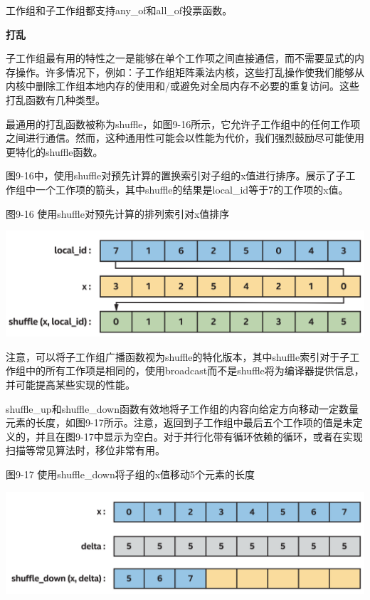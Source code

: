工作组和子工作组都支持any\_of和all\_of投票函数。\par

\hspace*{\fill} \par %
\textbf{打乱}

子工作组最有用的特性之一是能够在单个工作项之间直接通信，而不需要显式的内存操作。许多情况下，例如：子工作组矩阵乘法内核，这些打乱操作使我们能够从内核中删除工作组本地内存的使用和/或避免对全局内存不必要的重复访问。这些打乱函数有几种类型。\par

最通用的打乱函数被称为shuffle，如图9-16所示，它允许子工作组中的任何工作项之间进行通信。然而，这种通用性可能会以性能为代价，我们强烈鼓励尽可能使用更特化的shuffle函数。\par

图9-16中，使用shuffle对预先计算的置换索引对子组的x值进行排序。展示了子工作组中一个工作项的箭头，其中shuffle的结果是local\_id等于7的工作项的x值。\par

\hspace*{\fill} \par %
图9-16 使用shuffle对预先计算的排列索引对x值排序
\begin{center}
	\includegraphics[width=1.\textwidth]{content/chapter-9/images/9}
\end{center}

注意，可以将子工作组广播函数视为shuffle的特化版本，其中shuffle索引对于子工作组中的所有工作项是相同的，使用broadcast而不是shuffle将为编译器提供信息，并可能提高某些实现的性能。\par

shuffle\_up和shuffle\_down函数有效地将子工作组的内容向给定方向移动一定数量元素的长度，如图9-17所示。注意，返回到子工作组中最后五个工作项的值是未定义的，并且在图9-17中显示为空白。对于并行化带有循环依赖的循环，或者在实现扫描等常见算法时，移位非常有用。\par

\hspace*{\fill} \par %
图9-17 使用shuffle\_down将子组的x值移动5个元素的长度
\begin{center}
	\includegraphics[width=1.\textwidth]{content/chapter-9/images/10}
\end{center}

